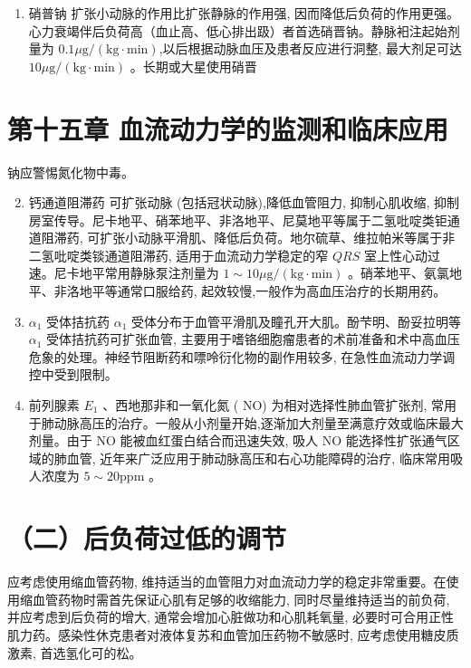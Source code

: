 \documentclass[10pt]{article}
\begin{document}
\begin{enumerate}
  \item 硝普钠 扩张小动脉的作用比扩张静脉的作用强, 因而降低后负荷的作用更强。心力衰竭伴后负荷高（血止高、低心排出趿）者首选硝晋钠。静脉衵注起始剂量为 $0.1 \mu \mathrm{g} /(\mathrm{kg} \cdot \mathrm{min})$,以后根据动脉血压及患者反应进行洞整, 最大剂足可达 $10 \mu \mathrm{g} /(\mathrm{kg} \cdot \mathrm{min})$ 。长期或大星使用硝晋
\end{enumerate}

\section*{第十五章 血流动力学的监测和临床应用}
钠应警惕氮化物中毒。

\begin{enumerate}
  \setcounter{enumi}{1}
  \item 钙通道阻滞药 可扩张动脉 (包括冠状动脉),降低血管阻力, 抑制心肌收缩, 抑制房室传导。尼卡地平、硝苯地平、非洛地平、尼莫地平等属于二氢吡啶类钜通道阻滞药, 可扩张小动脉平滑肌、降低后负荷。地尔硫草、维拉帕米等属于非二氢吡啶类锬通道阻滞药, 适用于血流动力学稳定的窄 $Q R S$ 室上性心动过速。尼卡地平常用静脉泵注剂量为 $1 \sim 10 \mu \mathrm{g} /(\mathrm{kg} \cdot \mathrm{min})$ 。硝苯地平、氨氯地平、非洛地平等通常口服给药, 起效较慢,一般作为高血压治疗的长期用药。

  \item $\alpha_{1}$ 受体拮抗药 $\alpha_{1}$ 受体分布于血管平滑肌及瞳孔开大肌。酚芐明、酚妥拉明等 $\alpha_{1}$ 受体拮抗药可扩张血管, 主要用于嗜铬细胞瘤患者的术前准备和术中高血压危象的处理。神经节阻断药和嘌呤衍化物的副作用较多, 在急性血流动力学调控中受到限制。

  \item 前列腺素 $E_{1}$ 、西地那非和一氧化氮 ( NO) 为相对选择性肺血管扩张剂, 常用于肺动脉高压的治疗。一般从小剂量开始,逐渐加大剂量至满意疗效或临床最大剂量。由于 NO 能被血红蛋白结合而迅速失效, 吸人 NO 能选择性扩张通气区域的肺血管, 近年来广泛应用于肺动脉高压和右心功能障碍的治疗, 临床常用吸人浓度为 $5 \sim 20 \mathrm{ppm}$ 。

\end{enumerate}

\section*{（二）后负荷过低的调节}
应考虑使用缩血管药物, 维持适当的血管阻力对血流动力学的稳定非常重要。在使用缩血管药物时需首先保证心肌有足够的收缩能力, 同时尽量维持适当的前负荷, 并应考虑到后负荷的增大, 通常会增加心脏做功和心肌耗氧量, 必要时可合用正性肌力药。感染性休克患者对液体复苏和血管加压药物不敏感时, 应考虑使用糖皮质激素, 首选氢化可的松。
\end{document}
